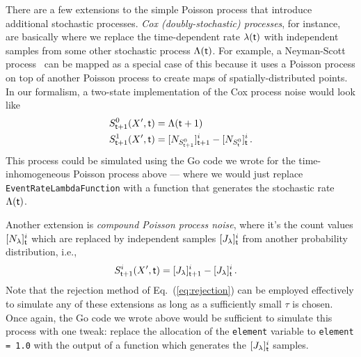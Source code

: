 \documentclass{book}
\begin{document}
There are a few extensions to the simple Poisson process that introduce additional stochastic processes. \emph{Cox (doubly-stochastic) processes}, for instance, are basically where we replace the time-dependent rate $\lambda ({\sf t})$ with independent samples from some other stochastic process $\Lambda ({\sf t})$. For example, a Neyman-Scott process~\cite{neyman1958statistical} can be mapped as a special case of this because it uses a Poisson process on top of another Poisson process to create maps of spatially-distributed points. In our formalism, a two-state implementation of the Cox process noise would look like
\begin{align}
S^{0}_{{\sf t}+1}(X',{\sf t}) &= \Lambda ({\sf t}+1) \\
S^{1}_{{\sf t}+1}(X',{\sf t}) &= [N_{S^{0}_{{\sf t}+1}}]^i_{{\sf t}+1}-[N_{S^{0}_{{\sf t}}}]^i_{\sf t}\,.
\end{align}
This process could be simulated using the Go code we wrote for the time-inhomogeneous Poisson process above --- where we would just replace \texttt{EventRateLambdaFunction} with a function that generates the stochastic rate $\Lambda ({\sf t})$.

Another extension is \emph{compound Poisson process noise}, where it's the count values $[N_{\lambda}]^i_{\sf t}$ which are replaced by independent samples $[J_{\lambda}]^i_{\sf t}$ from another probability distribution, i.e.,
\begin{align}
S^{i}_{{\sf t}+1}(X',{\sf t}) &= [J_{\lambda}]^i_{{\sf t}+1}-[J_{\lambda}]^i_{\sf t}\,.
\end{align}
Note that the rejection method of Eq.~(\ref{eq:rejection}) can be employed effectively to simulate any of these extensions as long as a sufficiently small $\tau$ is chosen. Once again, the Go code we wrote above would be sufficient to simulate this process with one tweak: replace the allocation of the \texttt{element} variable to \texttt{element = 1.0} with the output of a function which generates the $[J_{\lambda}]^i_{\sf t}$ samples.
\end{document}
